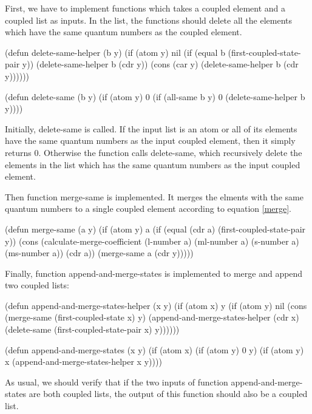 \documentclass[12pt,journal,compsoc]{IEEEtran}
\begin{document}
First, we have to implement functions which takes a coupled element and a coupled list as inputs. In the list, the functions should delete all the elements which have the same quantum numbers as the coupled element. 


\begin{acl2-lst}
(defun delete-same-helper (b y)
 (if (atom y)
  nil
  (if (equal b (first-coupled-state-pair y))
   (delete-same-helper b (cdr y))
   (cons (car y) (delete-same-helper b (cdr y))))))

(defun delete-same (b y)
 (if (atom y)
  0
  (if (all-same b y)
   0
   (delete-same-helper b y))))
\end{acl2-lst}

Initially, delete-same is called. If the input list is an atom or all of its elements have the same quantum numbers as the input coupled element, then it simply returns 0. Otherwise the function calls delete-same, which recursively delete the elements in the list which has the same quantum numbers as the input coupled element.

Then function merge-same is implemented. It merges the elments with the same quantum numbers to a single coupled element according to equation \ref{merge}.

\begin{acl2-lst}
(defun merge-same (a y)
 (if (atom y)
  a
  (if (equal (cdr a) (first-coupled-state-pair y))
   (cons (calculate-merge-coefficient 
	  (l-number a)
	  (ml-number a)
	  (s-number a)
	  (ms-number a))
    (cdr a))
   (merge-same a (cdr y)))))
\end{acl2-lst}

Finally, function append-and-merge-states is implemented to merge and append two coupled lists:

\begin{acl2-lst}
(defun append-and-merge-states-helper (x y)
 (if (atom x)
  y
  (if (atom y)
   nil
   (cons (merge-same (first-coupled-state x) y) 
    (append-and-merge-states-helper (cdr x)
     (delete-same 
	(first-coupled-state-pair x) y))))))

(defun append-and-merge-states (x y)
 (if (atom x)
  (if (atom y)
   0
   y)
  (if (atom y)
   x
   (append-and-merge-states-helper x y))))
\end{acl2-lst}

As usual, we should verify that if the two inputs of function append-and-merge-states are both coupled lists, the output of this function should also be a coupled list.
\end{document}
